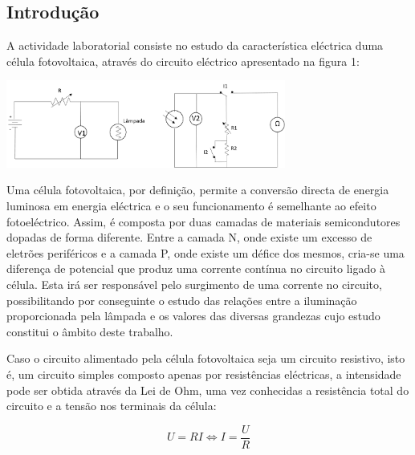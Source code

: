\documentclass[9pt]{extarticle}
\begin{document}
\begin{multicols}{2}

\section{Introdução}

\par A actividade laboratorial consiste no estudo da característica eléctrica duma célula fotovoltaica, através do circuito eléctrico apresentado na figura 1:

\hspace{-0.8cm}
\includegraphics[width=260pt]{circuito}
\begin{center}
\par{}
\end{center}

\par Uma célula fotovoltaica, por definição, permite a conversão directa de energia luminosa em energia eléctrica e o seu funcionamento é semelhante ao efeito fotoeléctrico. Assim, é composta por duas camadas de materiais semicondutores dopadas de forma diferente. Entre a camada N, onde existe um excesso de eletrões periféricos e a camada P, onde existe um défice dos mesmos, cria-se uma diferença de potencial que produz uma corrente contínua no circuito ligado à célula. Esta irá ser responsável pelo surgimento de uma corrente no circuito, possibilitando por conseguinte o estudo das relações entre a iluminação proporcionada pela lâmpada e os valores das diversas grandezas cujo estudo constitui o âmbito deste trabalho. 

\par Caso o circuito alimentado pela célula fotovoltaica seja um circuito resistivo, isto é, um circuito simples composto apenas por resistências eléctricas, a intensidade pode ser obtida através da Lei de Ohm, uma vez conhecidas a resistência total do circuito e a tensão nos terminais da célula:

\begin{equation} \label{eq1}
U=RI \Leftrightarrow I=\frac{U}{R}
\end{equation}


\end{multicols}
\end{document}
